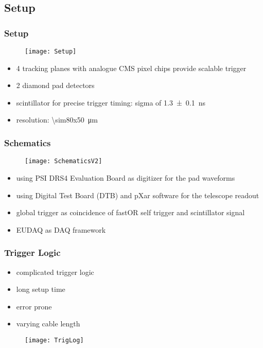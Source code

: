 \subsection{Setup}
\begin{frame}
	\frametitle{Setup}
	\begin{figure}
		\centering
		\texttt{[image: Setup]}
	\end{figure}
	\begin{itemize}
		\setlength{\itemsep}{\fill}
		\item 4 tracking planes with analogue CMS pixel chips \ra provide scalable trigger
		\item 2 diamond pad detectors
		\item scintillator for precise trigger timing: sigma of \SI{1.3\pm.1}{ns}
		\item resolution: \SI{\sim80x50}{\micro\meter}
	\end{itemize}
\end{frame}
\begin{frame}
	\frametitle{Schematics}
	\begin{figure}
		\centering
		\texttt{[image: SchematicsV2]}
	\end{figure}
	\begin{itemize}
		\setlength{\itemsep}{\fill}
		\item using PSI DRS4 Evaluation Board as digitizer for the pad waveforms
		\item using Digital Test Board (DTB) and pXar software for the telescope readout
		\item global trigger as coincidence of fastOR self trigger and scintillator signal
		\item EUDAQ as DAQ framework
	\end{itemize}
\end{frame}
\begin{frame}
	\frametitle{Trigger Logic}
	\begin{minipage}[c][.5\textheight]{4cm}
		\begin{itemize}
			\setlength{\itemsep}{\fill}
			\item complicated trigger logic
			\item long setup time
			\item error prone
			\item varying cable length
		\end{itemize}
	\end{minipage}
	\begin{minipage}{8cm}
		\begin{figure}
			\centering
			\texttt{[image: TrigLog]}
		\end{figure}
	\end{minipage}
\end{frame}
